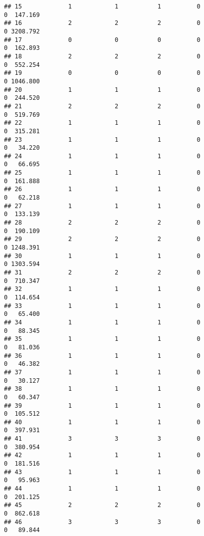 \documentclass[
]{article}
\begin{document}
\begin{verbatim}
## 15             1            1           1          0                0  147.169
## 16             2            2           2          0                0 3208.792
## 17             0            0           0          0                0  162.893
## 18             2            2           2          0                0  552.254
## 19             0            0           0          0                0 1046.800
## 20             1            1           1          0                0  244.520
## 21             2            2           2          0                0  519.769
## 22             1            1           1          0                0  315.281
## 23             1            1           1          0                0   34.220
## 24             1            1           1          0                0   66.695
## 25             1            1           1          0                0  161.888
## 26             1            1           1          0                0   62.218
## 27             1            1           1          0                0  133.139
## 28             2            2           2          0                0  190.109
## 29             2            2           2          0                0 1248.391
## 30             1            1           1          0                0 1303.594
## 31             2            2           2          0                0  710.347
## 32             1            1           1          0                0  114.654
## 33             1            1           1          0                0   65.400
## 34             1            1           1          0                0   88.345
## 35             1            1           1          0                0   81.036
## 36             1            1           1          0                0   46.382
## 37             1            1           1          0                0   30.127
## 38             1            1           1          0                0   60.347
## 39             1            1           1          0                0  105.512
## 40             1            1           1          0                0  397.931
## 41             3            3           3          0                0  380.954
## 42             1            1           1          0                0  181.516
## 43             1            1           1          0                0   95.963
## 44             1            1           1          0                0  201.125
## 45             2            2           2          0                0  862.618
## 46             3            3           3          0                0   89.844

\end{verbatim}
\end{document}
